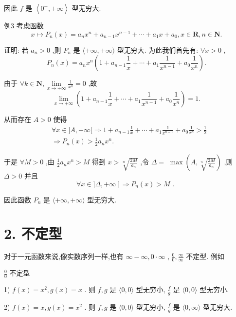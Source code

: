 因此 $f$ 是 $\left\langle  {{0}^{ + }, + \infty }\right\rangle$ 型无穷大.

例3 考虑函数
$$x \mapsto  {P}_{n}\left( x\right)  = {a}_{n}{x}^{n} + {a}_{n - 1}{x}^{n - 1} + \cdots  + {a}_{1}x + {a}_{0},x \in  \mathbf{R},n \in  \mathbf{N}.$$

证明: 若 ${a}_{n} > 0$ ,则 ${P}_{n}$ 是 $\langle  + \infty , + \infty \rangle$ 型无穷大. 为此我们首先有: $\forall x > 0$ ,
$${P}_{n}\left( x\right)  = {a}_{n}{x}^{n}\left( {1 + {a}_{n - 1}\frac{1}{x} + \cdots  + {a}_{1}\frac{1}{{x}^{n - 1}} + {a}_{0}\frac{1}{{x}^{n}}}\right) .$$

由于 $\forall k \in  \mathbf{N},\mathop{\lim }\limits_{{x \rightarrow   + \infty }}\frac{1}{{x}^{k}} = 0$ ,故
$$\mathop{\lim }\limits_{{x \rightarrow   + \infty }}\left( {1 + {a}_{n - 1}\frac{1}{x} + \cdots  + {a}_{1}\frac{1}{{x}^{n - 1}} + {a}_{0}\frac{1}{{x}^{n}}}\right)  = 1.$$

从而存在 $A > 0$ 使得
\begin{align*}
	&\forall x \in  \rbrack A, + \infty \lbrack  \Rightarrow  1 + {a}_{n - 1}\frac{1}{x} + \cdots  + {a}_{1}\frac{1}{{x}^{n - 1}} + {a}_{0}\frac{1}{{x}^{n}} > \frac{1}{2}\\
	&\Rightarrow  {P}_{n}\left( x\right)  > \frac{1}{2}{a}_{n}{x}^{n}.
\end{align*}

于是 $\forall M > 0$ ,由 $\frac{1}{2}{a}_{n}{x}^{n} > M$ 得到 $x > \sqrt[n]{\frac{2M}{{a}_{n}}}$ ,令 $\Delta  =$  $\max \left( {A,\sqrt[n]{\frac{2M}{{a}_{n}}}}\right)$ ,则 $\Delta  > 0$ 并且
$$\forall x \in  \rbrack \Delta , + \infty \left\lbrack  { \Rightarrow  {P}_{n}\left( x\right)  > M}\right. \text{ . }$$

因此函数 ${P}_{n}$ 是 $\langle  + \infty , + \infty \rangle$ 型无穷大.

\section*{2. 不定型}

对于一元函数来说,像实数序列一样,也有 $\infty  - \infty ,0 \cdot  \infty$ , $\frac{0}{0},\frac{\infty }{\infty }$ 不定型. 例如

$\frac{0}{0}$ 不定型

1) $f\left( x\right)  = {x}^{2},g\left( x\right)  = x$ . 则 $f,g$ 是 $\langle 0,0\rangle$ 型无穷小, $\frac{f}{g}$ 是 $\langle 0,0\rangle$ 型无穷小.

2) $f\left( x\right)  = x,g\left( x\right)  = {x}^{2}$ . 则 $f,g$ 是 $\langle 0,0\rangle$ 型无穷小, $\frac{f}{g}$ 是 $\langle 0,\infty \rangle$ 型无穷大.

